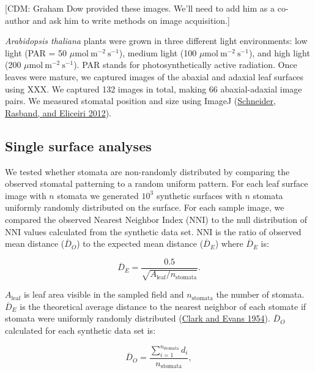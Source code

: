 \documentclass[12pt,halfline,a4paper,]{ouparticle}
\begin{document}
{[}CDM: Graham Dow provided these images. We'll need to add him as a
co-author and ask him to write methods on image acquisition.{]}

\emph{Arabidopsis thaliana} plants were grown in three different light
environments: low light (PAR = 50
\(\mu \text{mol}~\text{m}^{-2}~\text{s}^{-1}\)), medium light (100
\(\mu \text{mol}~\text{m}^{-2}~\text{s}^{-1}\)), and high light (200
\(\mu \text{mol}~\text{m}^{-2}~\text{s}^{-1}\)). PAR stands for
photosynthetically active radiation. Once leaves were mature, we
captured images of the abaxial and adaxial leaf surfaces using XXX. We
captured 132 images in total, making 66 abaxial-adaxial image pairs. We
measured stomatal position and size using ImageJ
(\protect\hyperlink{ref-schneider_nih_2012}{Schneider, Rasband, and
Eliceiri 2012}).

\hypertarget{single-surface-analyses}{%
\subsection{Single surface analyses}\label{single-surface-analyses}}

We tested whether stomata are non-randomly distributed by comparing the
observed stomatal patterning to a random uniform pattern. For each leaf
surface image with \(n\) stomata we generated \(10^3\) synthetic
surfaces with \(n\) stomata uniformly randomly distributed on the
surface. For each sample image, we compared the observed Nearest
Neighbor Index (\(\mathrm{NNI}\)) to the null distribution of
\(\mathrm{NNI}\) values calculated from the synthetic data set.
\(\mathrm{NNI}\) is the ratio of observed mean distance
(\(\overline{D}_O\)) to the expected mean distance (\(\overline{D}_E\))
where \(\overline{D}_E\) is:

\begin{equation}\label{eq:emd}
  \overline{D}_E = \frac{0.5}{\sqrt{A_\text{leaf} / n_\text{stomata}}}.
\end{equation}

\noindent \(A_\text{leaf}\) is leaf area visible in the sampled field
and \(n_\text{stomata}\) the number of stomata. \(\overline{D}_E\) is
the theoretical average distance to the nearest neighbor of each stomate
if stomata were uniformly randomly distributed
(\protect\hyperlink{ref-clark_distance_1954}{Clark and Evans 1954}).
\(\overline{D}_O\) calculated for each synthetic data set is:

\begin{equation}\label{eq:omd}
  \overline{D}_O = \frac{\sum_{i=1}^{n_\text{stomata}}d_i}{n_\text{stomata}},
\end{equation}
\end{document}
